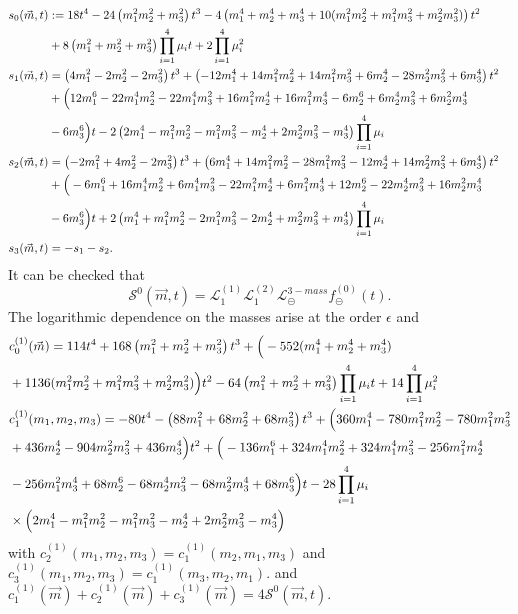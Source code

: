\documentclass[a4paper,12pt]{article}
\numberwithin{equation}{section}
\numberwithin{figure}{section}
\def\su{\circleddash}
\begin{document}
\begin{align}
  s_0(\vec m,t)&:=18 t^{4}-24\left(m_{1}^{2}m_{2}^{2}+
       m_{3}^{2}\right) t^{3}-4\left( m_{1}^{4}+m_2^4+m_3^4+10(
       m_{1}^{2} m_{2}^{2}+ m_{1}^{2}
       m_{3}^{2}+m_{2}^{2}
       m_{3}^{2})\right) t^{2}\cr
       &+8
       \left(m_{1}^{2}+m_{2}^{2}+m_{3}^{2}\right)\prod_{i=1}^4\mu_i
       t +2 \prod_{i=1}^4\mu_i^2 \cr
  s_1(\vec m,t)&=\left(4 m_{1}^{2}-2 m_{2}^{2}-2 m_{3}^{2}\right)
       t^{3}+\left(-12 m_{1}^{4}+14 m_{1}^{2} m_{2}^{2}+14 m_{1}^{2}
       m_{3}^{2}+6 m_{2}^{4}-28 m_{2}^{2} m_{3}^{2}+6 m_{3}^{4}\right)
       t^{2}\cr
       &+\Big(12 m_{1}^{6}-22 m_{1}^{4} m_{2}^{2}-22 m_{1}^{4} m_{3}^{2}+16 m_{1}^{2} m_{2}^{4}+16 m_{1}^{2} m_{3}^{4}-6 m_{2}^{6}+6 m_{2}^{4} m_{3}^{2}+6 m_{2}^{2} m_{3}^{4}\cr&-6 m_{3}^{6}\Big) t-2 \left(2 m_{1}^{4}-m_{1}^{2} m_{2}^{2}-m_{1}^{2} m_{3}^{2}-m_{2}^{4}+2 m_{2}^{2} m_{3}^{2}-m_{3}^{4}\right) \prod_{i=1}^4\mu_i\cr
       s_2(\vec m,t)&=\left(-2 m_{1}^{2}+4 m_{2}^{2}-2 m_{3}^{2}\right)
            t^{3}+\left(6 m_{1}^{4}+14 m_{1}^{2} m_{2}^{2}-28
            m_{1}^{2} m_{3}^{2}-12 m_{2}^{4}+14 m_{2}^{2} m_{3}^{2}+6
            m_{3}^{4}\right) t^{2}\cr
            &+\Big(-6 m_{1}^{6}+16 m_{1}^{4} m_{2}^{2}+6 m_{1}^{4} m_{3}^{2}-22 m_{1}^{2} m_{2}^{4}+6 m_{1}^{2} m_{3}^{4}+12 m_{2}^{6}-22 m_{2}^{4} m_{3}^{2}+16 m_{2}^{2} m_{3}^{4}\cr&-6 m_{3}^{6}\Big) t +2 \left(m_{1}^{4}+m_{1}^{2} m_{2}^{2}-2 m_{1}^{2} m_{3}^{2}-2 m_{2}^{4}+m_{2}^{2} m_{3}^{2}+m_{3}^{4}\right) \prod_{i=1}^4\mu_i
\cr
            s_3(\vec m,t)&=-s_1-s_2.
\end{align}
It can be checked that 
\begin{equation}
  \mathscr{S}^0(\vec m,t)=   \mathscr{L}^{(1)}_1
     \mathscr{L}^{(2)}_1    \mathscr{L}^{3-mass}_\su  f_\su^{(0)}(t).
\end{equation}
The logarithmic dependence on the masses arise at the order $\epsilon$ 
 and
 \begin{align}
&     c^{(1)}_0(\vec m)=114 t^{4}+168\left(m_{1}^{2}+ m_{2}^{2}+ m_{3}^{2}\right)
  t^{3}+\Big(-552 (m_{1}^{4}+m_2^4+m_3^4)\cr&+1136 (m_{1}^{2} m_{2}^{2}+
    m_{1}^{2} m_{3}^{2}+ m_{2}^{2} m_{3}^{2})\Big) t^{2}-64
  \left(m_{1}^{2}+m_{2}^{2}+m_{3}^{2}\right) \prod_{i=1}^4\mu_i t +14 \prod_{i=1}^4\mu_i^2\\
& c^{(1)}_1(m_1,m_2,m_3)=-80 t^{4}-\left( 88 m_{1}^{2}+ 68 m_{2}^{2}+68 m_{3}^{2}\right)
 t^{3}+\Big(360 m_{1}^{4}-780 m_{1}^{2} m_{2}^{2}-780 m_{1}^{2}
   m_{3}^{2}\cr&+436 m_{2}^{4}-904 m_{2}^{2} m_{3}^{2}+436
   m_{3}^{4}\Big) t^{2}+\Big(-136 m_{1}^{6}+324 m_{1}^{4}
   m_{2}^{2}+324 m_{1}^{4} m_{3}^{2}-256 m_{1}^{2} m_{2}^{4}\cr&-256
   m_{1}^{2} m_{3}^{4}+68 m_{2}^{6}-68 m_{2}^{4} m_{3}^{2}-68
   m_{2}^{2} m_{3}^{4}+68 m_{3}^{6}\Big) t -28   \prod_{i=1}^4\mu_i\cr&\times\Big(2 m_{1}^{4}-m_{1}^{2} m_{2}^{2}-m_{1}^{2} m_{3}^{2}-m_{2}^{4}+2 m_{2}^{2} m_{3}^{2}-m_{3}^{4}\Big) 
\end{align}
with $c^{(1)}_2(m_1,m_2,m_3)=c^{(1)}_1(m_2,m_1,m_3)$ and $c^{(1)}_3(m_1,m_2,m_3)=c^{(1)}_1(m_3,m_2,m_1)$.
and $c^{(1)}_1(\vec m)+c_2^{(1)}(\vec m)+c_3^{(1)}(\vec m)=4
\mathscr{S}^0(\vec m,t)$.
\end{document}
